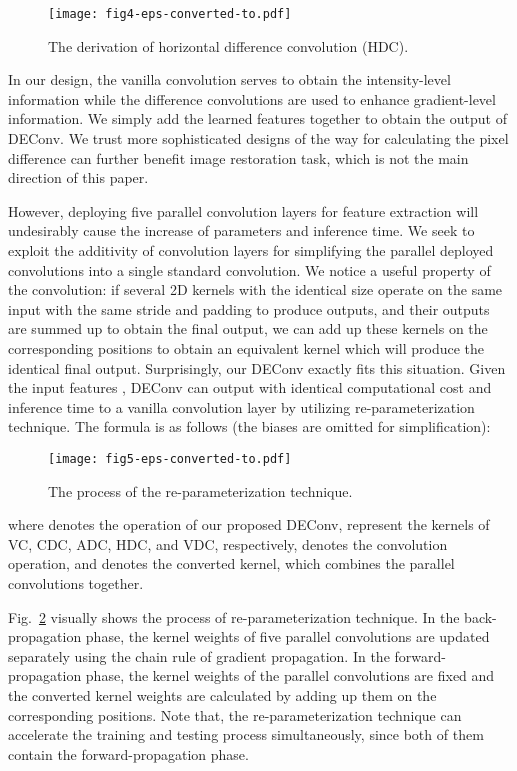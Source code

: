 \documentclass[lettersize,journal]{IEEEtran}
\begin{document}
\begin{figure}[!t]
	\centering
	\texttt{[image: fig4-eps-converted-to.pdf]}
	\caption{The derivation of horizontal difference convolution (HDC).}
	\label{fig:HDC}
\end{figure}


In our design, the vanilla convolution serves to obtain the intensity-level information while the difference convolutions are used to enhance gradient-level information.
We simply add the learned features together to obtain the output of DEConv.
We trust more sophisticated designs of the way for calculating the pixel difference can further benefit image restoration task, which is not the main direction of this paper.


However, deploying five parallel convolution layers for feature extraction will undesirably cause the increase of parameters and inference time.
We seek to exploit the additivity of convolution layers for simplifying the parallel deployed convolutions into a single standard convolution.
We notice a useful property of the convolution: 
if several 2D kernels with the identical size operate on the same input with the same stride and padding to produce outputs, and their outputs are summed up to obtain the final output, we can add up these kernels on the corresponding positions to obtain an equivalent kernel which will produce the identical final output.
Surprisingly, our DEConv exactly fits this situation.
Given the input features , DEConv can output  with identical computational cost and inference time to a vanilla convolution layer by utilizing re-parameterization technique.
The formula is as follows (the biases are omitted for simplification):

\begin{figure}[!t]
	\centering
	\texttt{[image: fig5-eps-converted-to.pdf]}
	\caption{The process of the re-parameterization technique.}
	\label{fig:fig5}
\end{figure}


where  denotes the operation of our proposed DEConv,  represent the kernels of VC, CDC, ADC, HDC, and VDC, respectively,  denotes the convolution operation, and  denotes the converted kernel, which combines the parallel convolutions together.

Fig.~\ref{fig:fig5} visually shows the process of re-parameterization technique.
In the back-propagation phase, the kernel weights of five parallel convolutions are updated separately using the chain rule of gradient propagation.
In the forward-propagation phase, the kernel weights of the parallel convolutions are fixed and the converted kernel weights are calculated by adding up them on the corresponding positions.
Note that, the re-parameterization technique can accelerate the training and testing process simultaneously, since both of them contain the forward-propagation phase.
\end{document}
